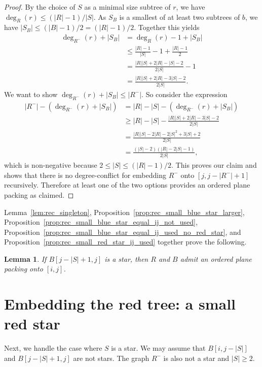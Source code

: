 \documentclass[11pt,a4paper,colorlinks=true,urlcolor=blue,citecolor=red]{article}
\theoremstyle{plain}
\newtheorem{lemma}[theorem]{Lemma}
\begin{document}
\begin{proof}
  By the choice of $S$ as a minimal size subtree of $r$, we have
  $\deg_R(r)\le(|R|-1)/|S|$. As $S_B$ is a smallest of at least two
  subtrees of $b$, we have $|S_B|\le(|B|-1)/2=(|R|-1)/2$. Together this
  yields
  \begin{align*}
    \deg_{R^-}(r)+|S_B| &= \deg_R(r)-1+|S_B|\\
    &\leq \frac{|R|-1}{|S|}-1+\frac{|R|-1}{2}\\
    &= \frac{|R||S|+2|R|-|S|-2}{2|S|}-1\\
    &= \frac{|R||S|+2|R|-3|S|-2}{2|S|}.
  \end{align*}
  We want to show $\deg_{R^-}(r)+|S_B|\le|R^-|$. So consider the
  expression
  \begin{align*}
    |R^-|-(\deg_{R^-}(r)+|S_B|) &= |R|-|S|-(\deg_{R^-}(r)+|S_B|)\\
    &\geq |R|-|S|-\frac{|R||S|+2|R|-3|S|-2}{2|S|}\\
    &= \frac{|R||S|-2|R|-2|S|^2+3|S|+2}{2|S|}\\
    &= \frac{(|S|-2)(|R|-2|S|-1)}{2|S|},
  \end{align*}
  which is non-negative because $2\le|S|\le(|R|-1)/2$. This proves our
  claim and shows that there is no degree-conflict for embedding $R^-$
  onto $[j,j-|R^-|+1]$ recursively. Therefore at least one of the two
  options provides an ordered plane packing as claimed.
\end{proof}

Lemma~\ref{lem:rec_singleton},
Proposition~\ref{prop:rec_small_blue_star_larger},
Proposition~\ref{prop:rec_small_blue_star_equal_ij_not_used},
Proposition~\ref{prop:rec_small_blue_star_equal_ij_used_no_red_star},
and Proposition~\ref{prop:rec_small_red_star_ij_used} together prove the
following.

\begin{lemma}
  \label{lem:rec_small_blue_star}
  If $B[j-|S|+1,j]$ is a star, then $R$ and $B$ admit an ordered plane
  packing onto $[i,j]$.
\end{lemma}

\section{Embedding the red tree: a small red star}
\label{subsec:small_red_star}
Next, we handle the case where $S$ is a star. We may assume that
$B[i,j-|S|]$ and $B[j-|S|+1,j]$ are not stars. The graph $R^-$ is also
not a star and $|S|\geq 2$.
\end{document}
